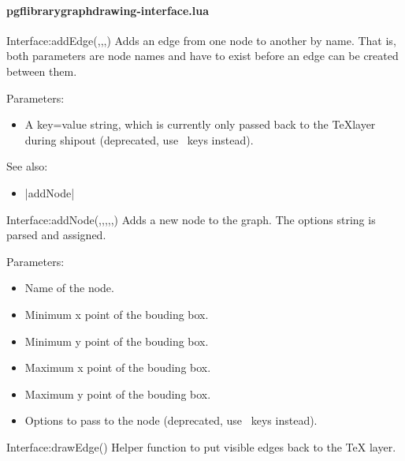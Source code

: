 
\paragraph{pgflibrarygraphdrawing-interface.lua}


\begin{luacommand}{{Interface:addEdge}(,,,)}
Adds an edge from one node to another by name.  That is, both parameters are node names and have to exist before an edge can be created between them.

Parameters:
\begin{itemize}
	\item[]  \subitem A key=value string, which is currently only passed back to the \TeX layer during shipout (deprecated, use \tikzname\ keys instead).
\end{itemize}



See also:
\begin{itemize}
	\item[] |addNode|
\end{itemize}

\end{luacommand}\begin{luacommand}{{Interface:addNode}(,,,,,)}
Adds a new node to the graph.  The options string is parsed and assigned.

Parameters:
\begin{itemize}
	\item[]  \subitem Name of the node.\item[]  \subitem Minimum x point of the bouding box.\item[]  \subitem Minimum y point of the bouding box.\item[]  \subitem Maximum x point of the bouding box.\item[]  \subitem Maximum y point of the bouding box.\item[]  \subitem Options to pass to the node (deprecated, use \tikzname\ keys instead).
\end{itemize}



\end{luacommand}\begin{luacommand}{{Interface:drawEdge}()}
Helper function to put visible edges back to the TeX layer.


\end{luacommand}
